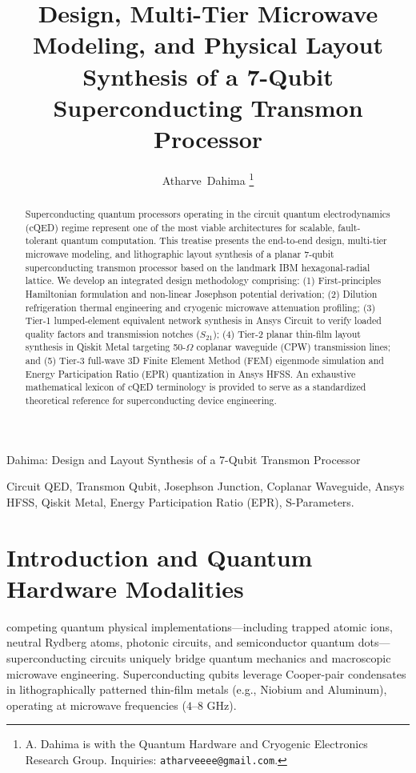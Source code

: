\documentclass[10pt,journal,compsoc]{IEEEtran}
\begin{document}
\title{Design, Multi-Tier Microwave Modeling, and Physical Layout Synthesis of a 7-Qubit Superconducting Transmon Processor}

\author{Atharve~Dahima
\thanks{A. Dahima is with the Quantum Hardware and Cryogenic Electronics Research Group. Inquiries: \texttt{atharveeee@gmail.com}.}}

%
{Dahima: Design and Layout Synthesis of a 7-Qubit Transmon Processor}

\maketitle

\begin{abstract}
Superconducting quantum processors operating in the circuit quantum electrodynamics (cQED) regime represent one of the most viable architectures for scalable, fault-tolerant quantum computation. This treatise presents the end-to-end design, multi-tier microwave modeling, and lithographic layout synthesis of a planar 7-qubit superconducting transmon processor based on the landmark IBM hexagonal-radial lattice. We develop an integrated design methodology comprising: (1) First-principles Hamiltonian formulation and non-linear Josephson potential derivation; (2) Dilution refrigeration thermal engineering and cryogenic microwave attenuation profiling; (3) Tier-1 lumped-element equivalent network synthesis in Ansys Circuit to verify loaded quality factors and transmission notches ($S_{21}$); (4) Tier-2 planar thin-film layout synthesis in Qiskit Metal targeting 50-$\Omega$ coplanar waveguide (CPW) transmission lines; and (5) Tier-3 full-wave 3D Finite Element Method (FEM) eigenmode simulation and Energy Participation Ratio (EPR) quantization in Ansys HFSS. An exhaustive mathematical lexicon of cQED terminology is provided to serve as a standardized theoretical reference for superconducting device engineering.
\end{abstract}

\begin{IEEEkeywords}
Circuit QED, Transmon Qubit, Josephson Junction, Coplanar Waveguide, Ansys HFSS, Qiskit Metal, Energy Participation Ratio (EPR), S-Parameters.
\end{IEEEkeywords}

\section{Introduction and Quantum Hardware Modalities}
 competing quantum physical implementations---including trapped atomic ions, neutral Rydberg atoms, photonic circuits, and semiconductor quantum dots---superconducting circuits uniquely bridge quantum mechanics and macroscopic microwave engineering. Superconducting qubits leverage Cooper-pair condensates in lithographically patterned thin-film metals (e.g., Niobium and Aluminum), operating at microwave frequencies ($4\text{--}8\text{ GHz}$). 
\end{document}
